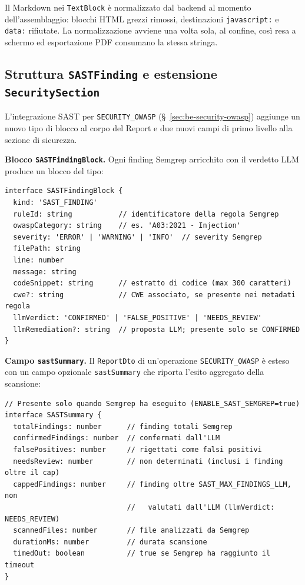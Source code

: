 \documentclass[11pt,a4paper]{article}
\begin{document}
Il Markdown nei \texttt{TextBlock} è normalizzato dal backend al momento dell'assemblaggio: blocchi HTML grezzi rimossi, destinazioni \texttt{javascript:} e \texttt{data:} rifiutate. La normalizzazione avviene una volta sola, al confine, così resa a schermo ed esportazione PDF consumano la stessa stringa.

\subsection{Struttura \texttt{SASTFinding} e estensione \texttt{SecuritySection}}
\label{ssec:be-sast-schema}

L'integrazione SAST per \texttt{SECURITY\_OWASP} (\S~\ref{sec:be-security-owasp}) aggiunge un nuovo tipo di blocco al corpo del Report e due nuovi campi di primo livello alla sezione di sicurezza.

\noindent\textbf{Blocco \texttt{SASTFindingBlock}.} Ogni finding Semgrep arricchito con il verdetto LLM produce un blocco del tipo:

\begin{lstlisting}[caption={Tipo \texttt{SASTFindingBlock}: finding SAST con verdetto LLM (SECURITY\_OWASP).}]
interface SASTFindingBlock {
  kind: 'SAST_FINDING'
  ruleId: string           // identificatore della regola Semgrep
  owaspCategory: string    // es. 'A03:2021 - Injection'
  severity: 'ERROR' | 'WARNING' | 'INFO'  // severity Semgrep
  filePath: string
  line: number
  message: string
  codeSnippet: string      // estratto di codice (max 300 caratteri)
  cwe?: string             // CWE associato, se presente nei metadati regola
  llmVerdict: 'CONFIRMED' | 'FALSE_POSITIVE' | 'NEEDS_REVIEW'
  llmRemediation?: string  // proposta LLM; presente solo se CONFIRMED
}
\end{lstlisting}

\noindent\textbf{Campo \texttt{sastSummary}.} Il \texttt{ReportDto} di un'operazione \texttt{SECURITY\_OWASP} è esteso con un campo opzionale \texttt{sastSummary} che riporta l'esito aggregato della scansione:

\begin{lstlisting}[caption={Campo \texttt{sastSummary} nel \texttt{ReportDto} per SECURITY\_OWASP.}]
// Presente solo quando Semgrep ha eseguito (ENABLE_SAST_SEMGREP=true)
interface SASTSummary {
  totalFindings: number      // finding totali Semgrep
  confirmedFindings: number  // confermati dall'LLM
  falsePositives: number     // rigettati come falsi positivi
  needsReview: number        // non determinati (inclusi i finding oltre il cap)
  cappedFindings: number     // finding oltre SAST_MAX_FINDINGS_LLM, non
                             //   valutati dall'LLM (llmVerdict: NEEDS_REVIEW)
  scannedFiles: number       // file analizzati da Semgrep
  durationMs: number         // durata scansione
  timedOut: boolean          // true se Semgrep ha raggiunto il timeout
}
\end{lstlisting}
\end{document}

